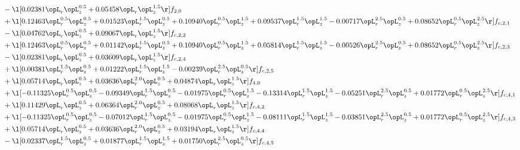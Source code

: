 \begin{alignat}{2}
& - \l[  0.02381 \opL_r \opL_z^{0.5} +  0.05458 \opL_r \opL_z^{1.5}  \r] f_{2,0} \nonumber \\ 
& + \l[  0.12463 \opL_r^{0.5} \opL_z^{0.5} +  0.01523 \opL_r^{1.5} \opL_z^{0.5} +  0.10940 \opL_r^{0.5} \opL_z^{1.5} +  0.09537 \opL_r^{1.5} \opL_z^{1.5}   -0.00717 \opL_r^{2.5} \opL_z^{0.5} +  0.08652 \opL_r^{0.5} \opL_z^{2.5}  \r] f_{c,2,1} \nonumber \\ 
& - \l[  0.04762 \opL_r \opL_z^{0.5} +  0.09067 \opL_r \opL_z^{1.5}  \r] f_{c,2,2} \nonumber \\ 
& + \l[  0.12463 \opL_r^{0.5} \opL_z^{0.5} +  0.01142 \opL_r^{1.5} \opL_z^{0.5} +  0.10940 \opL_r^{0.5} \opL_z^{1.5} +  0.05814 \opL_r^{1.5} \opL_z^{1.5}   -0.00526 \opL_r^{2.5} \opL_z^{0.5} +  0.08652 \opL_r^{0.5} \opL_z^{2.5}  \r] f_{c,2,3} \nonumber \\ 
& - \l[  0.02381 \opL_r \opL_z^{0.5} +  0.03609 \opL_r \opL_z^{1.5}  \r] f_{c,2,4} \nonumber \\ 
& + \l[  0.00381 \opL_r^{1.5} \opL_z^{0.5} +  0.01222 \opL_r^{1.5} \opL_z^{1.5}   -0.00239 \opL_r^{2.5} \opL_z^{0.5}  \r] f_{c,2,5} \nonumber \\ 
& + \l[  0.05714 \opL_r \opL_z^{0.5} +  0.03636 \opL_r^{2.0} \opL_z^{0.5} +  0.04874 \opL_r \opL_z^{1.5}  \r] f_{4,0} \nonumber \\ 
& + \l[  -0.11325 \opL_r^{0.5} \opL_z^{0.5}   -0.09349 \opL_r^{1.5} \opL_z^{0.5}   -0.01975 \opL_r^{0.5} \opL_z^{1.5}   -0.13314 \opL_r^{1.5} \opL_z^{1.5}   -0.05251 \opL_r^{2.5} \opL_z^{0.5} +  0.01772 \opL_r^{0.5} \opL_z^{2.5}  \r] f_{c,4,1} \nonumber \\ 
& + \l[  0.11429 \opL_r \opL_z^{0.5} +  0.06364 \opL_r^{2.0} \opL_z^{0.5} +  0.08068 \opL_r \opL_z^{1.5}  \r] f_{c,4,2} \nonumber \\ 
& + \l[  -0.11325 \opL_r^{0.5} \opL_z^{0.5}   -0.07012 \opL_r^{1.5} \opL_z^{0.5}   -0.01975 \opL_r^{0.5} \opL_z^{1.5}   -0.08111 \opL_r^{1.5} \opL_z^{1.5}   -0.03851 \opL_r^{2.5} \opL_z^{0.5} +  0.01772 \opL_r^{0.5} \opL_z^{2.5}  \r] f_{c,4,3} \nonumber \\ 
& + \l[  0.05714 \opL_r \opL_z^{0.5} +  0.03636 \opL_r^{2.0} \opL_z^{0.5} +  0.03194 \opL_r \opL_z^{1.5}  \r] f_{c,4,4} \nonumber \\ 
& - \l[  0.02337 \opL_r^{1.5} \opL_z^{0.5} +  0.01877 \opL_r^{1.5} \opL_z^{1.5} +  0.01750 \opL_r^{2.5} \opL_z^{0.5}  \r] f_{c,4,5} \nonumber \\ 
\end{alignat} 


